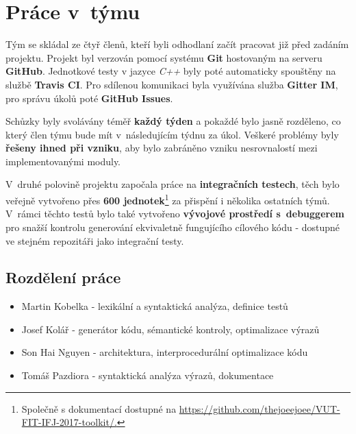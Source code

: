 \section{Práce v~týmu}
Tým se skládal ze čtyř členů, kteří byli odhodlaní začít
pracovat již před zadáním projektu. Projekt byl verzován pomocí systému \textbf{Git} hostovaným na serveru \textbf{GitHub}. Jednotkové testy v jazyce \emph{C++} byly poté automaticky spouštěny na službě \textbf{Travis CI}. Pro sdílenou komunikaci byla využívána služba \textbf{Gitter IM}, pro správu úkolů poté \textbf{GitHub Issues}.

Schůzky byly svolávány téměř \textbf{každý týden} a pokaždé bylo jasně rozděleno, co který člen týmu bude mít v~následujícím týdnu za úkol. Veškeré problémy byly \textbf{řešeny ihned při vzniku}, aby bylo zabráněno vzniku nesrovnalostí mezi implementovanými moduly.

V~druhé polovině projektu započala práce na \textbf{integračních testech}, těch bylo veřejně vytvořeno přes \textbf{600 jednotek}\footnote{Společně s dokumentací dostupné na \href{https://github.com/thejoeejoee/VUT-FIT-IFJ-2017-toolkit/}{https://github.com/thejoeejoee/VUT-FIT-IFJ-2017-toolkit/.}} za přispění i několika ostatních týmů. V~rámci těchto testů bylo také vytvořeno \textbf{vývojové prostředí s~debuggerem} pro snažší kontrolu generování ekvivaletně fungujícího cílového kódu - dostupné ve stejném repozitáři jako integrační testy.

\subsection{Rozdělení práce}
\begin{itemize}
    \item Martin Kobelka - lexikální a syntaktická analýza, definice testů
    \item Josef Kolář - generátor kódu, sémantické kontroly, optimalizace výrazů
    \item Son Hai Nguyen - architektura, interprocedurální optimalizace kódu
    \item Tomáš Pazdiora - syntaktická analýza výrazů, dokumentace
\end{itemize}